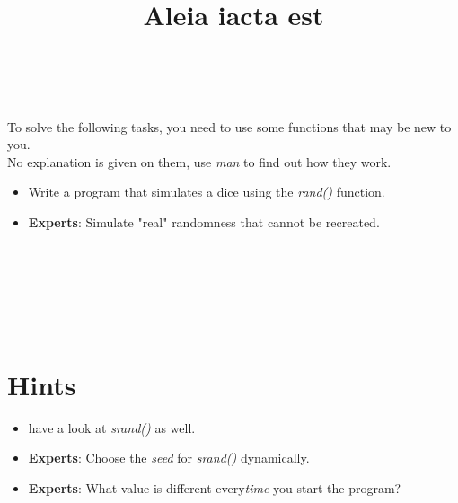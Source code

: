 


\title{Aleia iacta est} %
\author{} %
\renewcommand{\difficulty}{Medium} %
\renewcommand{\requirements}{Man, standard library} %
\renewcommand{\aims}{Get used to man} %


 \maketitle
 \taskinfos

\ \\\ \\
To solve the following tasks, you need to use some functions that may be new to you. \\
No explanation is given on them, use \textit{man} to find out how they work. \\
\begin{itemize}
	\item Write a program that simulates a dice using the \textit{rand()} function.
	\item \textbf{Experts}: Simulate "real" randomness that cannot be recreated.
\end{itemize}	
 
 
\ \\\ \\\ \\\ \\\ \\
\section*{Hints}
	\begin{itemize}
		\item have a look at \textit{srand()} as well.
		\item \textbf{Experts}: Choose the \textit{seed} for \textit{srand()} dynamically.
		\item \textbf{Experts}: What value is different every\textit{time} you start the program?
	\end{itemize}
 

